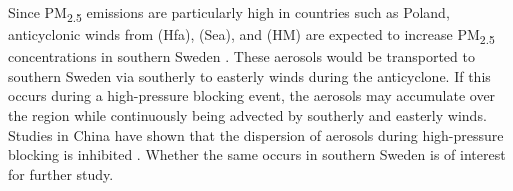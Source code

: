 Since PM\textsubscript{2.5} emissions are particularly high in countries such as Poland, anticyclonic winds from (Hfa), (Sea), and (HM) are expected to increase PM\textsubscript{2.5} concentrations in southern Sweden \cite{EEA2024}. These aerosols would be transported to southern Sweden via southerly to easterly winds during the anticyclone. If this occurs during a high-pressure blocking event, the aerosols may accumulate over the region while continuously being advected by southerly and easterly winds. Studies in China have shown that the dispersion of aerosols during high-pressure blocking is inhibited \cite{Cai2020}. Whether the same occurs in southern Sweden is of interest for further study.